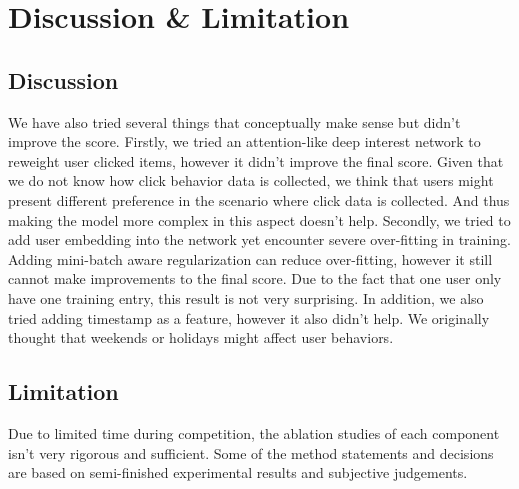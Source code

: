 \section{Discussion \& Limitation}


\subsection{Discussion}


We have also tried several things that conceptually make sense but didn’t improve the score.
Firstly, we tried an attention-like deep interest network \cite{din} to reweight user clicked items, however it didn't improve the final score.
Given that we do not know how click behavior data is collected, we think that users might present different preference in the scenario where click data is collected. And thus making the model more complex in this aspect doesn't help.
Secondly, we tried to add user embedding into the network yet encounter severe over-fitting in training. Adding mini-batch aware regularization \cite{din} can reduce over-fitting, however it still cannot make improvements to the final score.
Due to the fact that one user only have one training entry, this result is not very surprising.
In addition, we also tried adding timestamp as a feature, however it also didn't help. We originally thought that weekends or holidays might affect user behaviors.



\subsection{Limitation}
Due to limited time during competition, the ablation studies of each component isn't very rigorous and sufficient.
Some of the method statements and decisions are based on semi-finished experimental results and subjective judgements.
